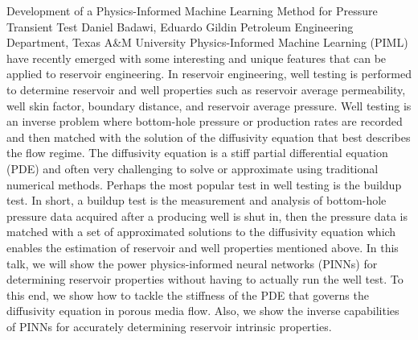 \vspace{1.5ex}
\abs
{Development of a Physics-Informed Machine Learning Method for Pressure Transient Test}
{Daniel Badawi, Eduardo Gildin}
{Petroleum Engineering Department, Texas A\&M University}
{Physics-Informed Machine Learning (PIML) have recently emerged with some interesting and unique features that can be applied to reservoir engineering. In reservoir engineering, well testing  is performed to determine reservoir and well properties such as reservoir average permeability, well skin factor, boundary distance, and reservoir average pressure. Well testing is an inverse problem where bottom-hole pressure or production rates are recorded and then matched with the solution of the diffusivity equation that best describes the flow regime. The diffusivity equation is a stiff partial differential equation (PDE) and often very challenging to solve or approximate using traditional numerical methods. Perhaps the most popular test in well testing is the buildup test. In short, a buildup test is the measurement and analysis of bottom-hole pressure data acquired after a producing well is shut in, then the pressure data is matched with a set of approximated solutions to the diffusivity equation which enables the estimation of reservoir and well properties mentioned above. In this talk, we will show the power physics-informed neural networks (PINNs) for determining reservoir properties without having to actually run the well test. To this end, we  show how to tackle the stiffness of the PDE that governs the diffusivity equation in porous media flow. Also, we show the inverse capabilities of PINNs for accurately determining reservoir intrinsic properties.}


